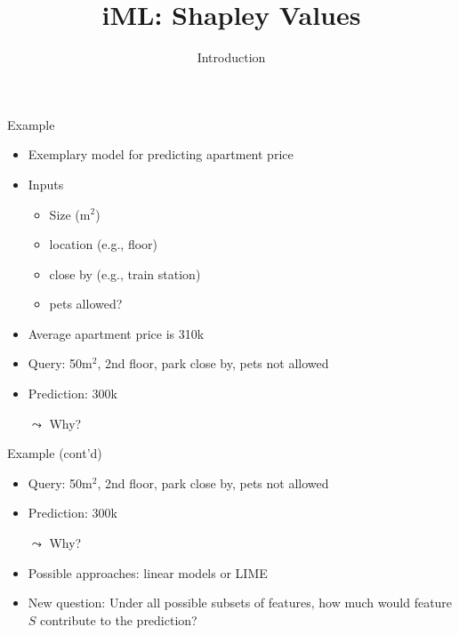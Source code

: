\documentclass[aspectratio=169]{../latex_main/tntbeamer}  %
\title[Introduction]{iML: Shapley Values}
\subtitle{Introduction}
\begin{document}
	
	\maketitle
	
	\begin{frame}[c]{Example}
	
	\begin{itemize}
	    \item Exemplary model for predicting apartment price
	    \item Inputs
	    \begin{itemize}
	        \item Size (m$^2$)
	        \item location (e.g., floor)
	        \item close by (e.g., train station)
	        \item pets allowed?
	    \end{itemize}
	    \item Average apartment price is 310k
	    \pause
	    \bigskip
	    \item Query: 50m$^2$, 2nd floor, park close by, pets not allowed
	    \item Prediction: 300k
	    \item[$\leadsto$] Why?
	\end{itemize}
	
	\end{frame}

\begin{frame}[c]{Example (cont'd)}
	
	\begin{itemize}
	    \item Query: 50m$^2$, 2nd floor, park close by, pets not allowed
	    \item Prediction: 300k
	    \item[$\leadsto$] Why?
	    \bigskip
        \item Possible approaches: linear models or LIME
        \item \alert{New question:} Under all possible subsets of features, how much would feature $S$ contribute to the prediction?
	\end{itemize}
	
\end{frame}
\end{document}

